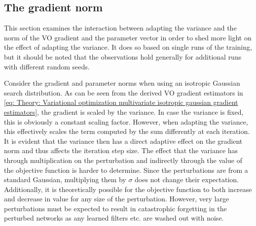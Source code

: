 \subsection{The gradient norm}
This section examines the interaction between adapting the variance and the norm of the \gls{VO} gradient and the parameter vector in order to shed more light on the effect of adapting the variance. It does so based on single runs of the training, but it should be noted that the observations hold generally for additional runs with different random seeds.

Consider the gradient and parameter norms when using an isotropic Gaussian search distribution. 
As can be seen from the derived \gls{VO} gradient estimators in \eqref{eq: Theory: Variational optimization multivariate isotropic gaussian gradient estimators}, the gradient is scaled by the variance.
In case the variance is fixed, this is obviously a constant scaling factor.
However, when adapting the variance, this effectively scales the term computed by the sum differently at each iteration. It is evident that the variance then has a direct adaptive effect on the gradient norm and thus affects the iteration step size. The effect that the variance has through multiplication on the perturbation and indirectly through the value of the objective function is harder to determine. Since the perturbations are from a standard Gaussian, multiplying them by $\sigma$ does not change their expectation. Additionally, it is theoretically possible for the objective function to both increase and decrease in value for any size of the perturbation. However, very large perturbations must be expected to result in catastrophic forgetting in the perturbed networks as any learned filters etc. are washed out with noise.

